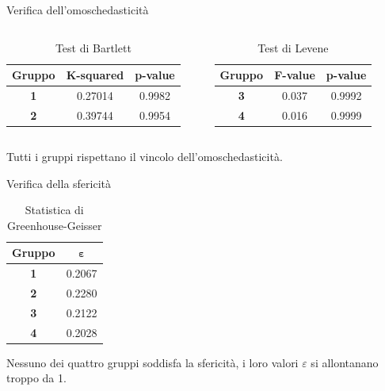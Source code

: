 \documentclass{beamer}
\begin{document}
\begin{frame}{Verifica dell'omoschedasticità}
	\begin{columns}
			\begin{table}[htbp]
				\captionsetup{labelformat=empty} %
				\caption{Test di Bartlett}
				\begin{tabular}{|c|c|c|}
				\hline
				\textbf{Gruppo} & \textbf{K-squared} & \textbf{p-value} \\
				\hline
				\textbf{1} & 0.27014 & 0.9982 \\\cline{1-3}
				\textbf{2} & 0.39744 & 0.9954 \\\cline{1-3}
				\hline
				\end{tabular}
			\end{table}
			\begin{table}[htbp]
				\captionsetup{labelformat=empty} %
				\caption{Test di Levene}
				\begin{tabular}{|c|c|c|}
				\hline
				\textbf{Gruppo} & \textbf{F-value} & \textbf{p-value} \\
				\hline
				\textbf{3} & 0.037 & 0.9992 \\\cline{1-3}
				\textbf{4} & 0.016 & 0.9999 \\\cline{1-3}
				\hline
				\end{tabular}
			\end{table}
	\end{columns}
	Tutti i gruppi rispettano il vincolo dell'omoschedasticità.
\end{frame}

\begin{frame}{Verifica della sfericità}
	\begin{table}[htbp]
		\captionsetup{labelformat=empty} %
		\caption{Statistica di Greenhouse-Geisser}
		\begin{center}
		\begin{tabular}{|c|c|}
		\hline
		\textbf{Gruppo} & $\boldsymbol{\varepsilon}$\\
		\hline
		\textbf{1} & 0.2067 \\\cline{1-2}
		\textbf{2} & 0.2280 \\\cline{1-2}
		\textbf{3} & 0.2122 \\\cline{1-2}
		\textbf{4} & 0.2028 \\\cline{1-2}
		\hline
		\end{tabular}
		\label{tab4}
		\end{center}
	\end{table}
	Nessuno dei quattro gruppi
	soddisfa la sfericità, i loro valori $\varepsilon$
	si allontanano troppo da 1.
\end{frame}
\end{document}
